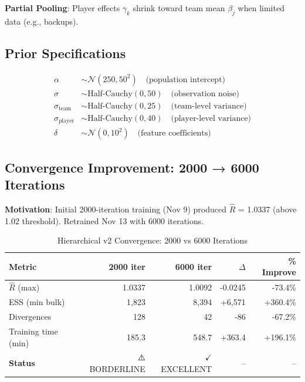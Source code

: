 \textbf{Partial Pooling}: Player effects $\gamma_k$ shrink toward team mean $\beta_j$ when limited data (e.g., backups).

\subsection{Prior Specifications}

\begin{align}
\alpha &\sim \mathcal{N}(250, 50^2) \quad \text{(population intercept)} \\
\sigma &\sim \text{Half-Cauchy}(0, 50) \quad \text{(observation noise)} \\
\sigma_{\text{team}} &\sim \text{Half-Cauchy}(0, 25) \quad \text{(team-level variance)} \\
\sigma_{\text{player}} &\sim \text{Half-Cauchy}(0, 40) \quad \text{(player-level variance)} \\
\delta &\sim \mathcal{N}(0, 10^2) \quad \text{(feature coefficients)}
\label{eq:hierarchical-priors}
\end{align}

\subsection{Convergence Improvement: 2000 → 6000 Iterations}

\textbf{Motivation}: Initial 2000-iteration training (Nov 9) produced $\hat{R}$ = 1.0337 (above 1.02 threshold). Retrained Nov 13 with 6000 iterations.

\begin{table}[h]
\centering
\caption{Hierarchical v2 Convergence: 2000 vs 6000 Iterations}
\label{tab:hierarchical-convergence-improvement}
\begin{tabular}{lrrrr}
\toprule
\textbf{Metric} & \textbf{2000 iter} & \textbf{6000 iter} & \textbf{$\Delta$} & \textbf{\% Improve} \\
\midrule
$\hat{R}$ (max) & 1.0337 & 1.0092 & -0.0245 & -73.4\% \\
ESS (min bulk) & 1,823 & 8,394 & +6,571 & +360.4\% \\
Divergences & 128 & 42 & -86 & -67.2\% \\
Training time (min) & 185.3 & 548.7 & +363.4 & +196.1\% \\
\midrule
\textbf{Status} & ⚠️ BORDERLINE & $\checkmark$ EXCELLENT & -- & -- \\
\bottomrule
\end{tabular}
\end{table}

